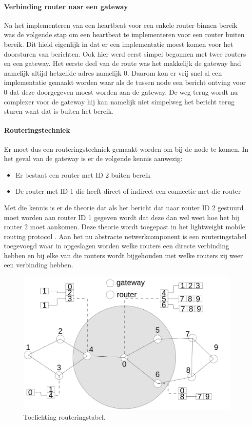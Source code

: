 \documentclass[a4paper, 11pt, oneside]{report}
\begin{document}
\paragraph{Verbinding router naar een gateway}
Na het implementeren van een heartbeat voor een enkele router binnen bereik was de volgende stap om een heartbeat te implementeren voor een router buiten bereik. Dit hield eigenlijk in dat er een implementatie moest komen voor het doorsturen van berichten. Ook hier werd eerst simpel begonnen met twee routers en een gateway. Het eerste deel van de route was het makkelijk de gateway had namelijk altijd hetzelfde adres namelijk 0. Daarom kon er vrij snel al een implementatie gemaakt worden waar als de tussen node een bericht ontving voor 0 dat deze doorgegeven moest worden aan de gateway. De weg terug wordt nu complexer voor de gateway hij kan namelijk niet simpelweg het bericht terug sturen want dat is buiten het bereik.
\paragraph{Routeringstechniek}
Er moet dus een routeringstechniek gemaakt worden om bij de node te komen.
In het geval van de gateway is er de volgende kennis aanwezig:
\begin{itemize}
	\item Er bestaat een router met ID 2 buiten bereik
	\item De router met ID 1 die heeft direct of indirect een connectie met die router
\end{itemize}

Met die kennis is er de theorie dat als het bericht dat naar router ID 2 gestuurd moet worden aan router ID 1 gegeven wordt dat deze dan wel weet hoe het bij router 2 moet aankomen.
Deze theorie wordt toegepast in het lightweight mobile routing protocol \cite{LMR}.
Aan het nu abstracte netwerkcomponent is een routeringstabel toegevoegd waar in opgeslagen worden welke routers een directe verbinding hebben en bij elke van die routers wordt bijgehouden met welke routers zij weer een verbinding hebben.

\begin{figure}[H]
	\begin{center}\includegraphics[width=0.6\linewidth]{Afbeeldingen/uitlegtabel.png}\end{center}
	\caption{Toelichting routeringstabel.}
	\label{fig:routeringstabel}
\end{figure}
\end{document}
